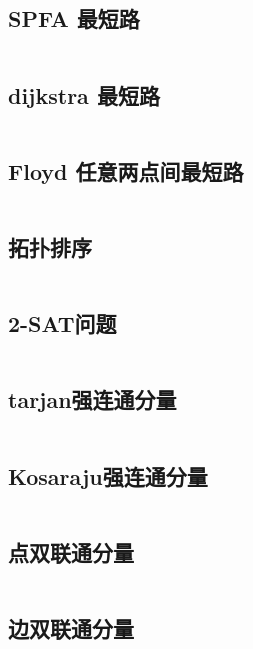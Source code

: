 \inputminted{cpp}{code/MST_Prim.cc}

\subsection{SPFA 最短路} 

\inputminted{cpp}{code/SPFA.cc}

\subsection{dijkstra 最短路} 

\inputminted{cpp}{code/dijkstra.cc}

\subsection{Floyd 任意两点间最短路} 

\inputminted{cpp}{code/Floyd.cc}

\subsection{拓扑排序} 

\inputminted{cpp}{code/拓扑排序.cc}

\subsection{2-SAT问题} 

\inputminted{cpp}{code/TwoSAT.cc}

\subsection{tarjan强连通分量} 

\inputminted{cpp}{code/tarjan.cc}

\subsection{Kosaraju强连通分量} 

\inputminted{cpp}{code/Kosaraju.cc}

\subsection{点双联通分量} 

\inputminted{cpp}{code/BCCpoint.cc}

\subsection{边双联通分量} 

